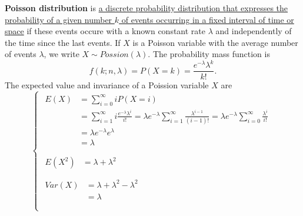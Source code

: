 \documentclass[10pt,onecolumn]{book}
\begin{document}
\textbf{Poisson distribution} is \uline{a discrete probability distribution that expresses the probability of a given number $k$ of events occurring in a fixed interval of time or space} if these events occure with a known constant rate $\lambda$ and independently of the time since the last events. If $X$ is a Poisson variable with the average number of events $\lambda$, we write $X \sim Possion(\lambda)$. The probability mass function is
\begin{equation}
f(k; n, \lambda) = P(X = k) = \frac{e^{-\lambda} \lambda^k}{k!}.
\end{equation}
The expected value and invariance of a Poission variable $X$ are
\begin{equation}\label{eq:poisson_distribution_e_var}
\left\{
	\begin{array}{lr}
	\begin{split}
	E(X)  & = \sum_{i=0}^{\infty} i P(X = i) \\
		  & = \sum_{i=1}^{\infty} i \frac{e^{-\lambda} \lambda^i}{i!} 
		    = \lambda e^{-\lambda} \sum_{i=1}^{\infty} \frac{\lambda^{i - 1}}{(i - 1)!} 
		    = \lambda e^{-\lambda} \sum_{i=0}^{\infty} \frac{\lambda^{i}}{i!} \\
		  & = \lambda e^{-\lambda} e ^ \lambda \\
		  & = \lambda \\
	\end{split} \\
	\begin{split}
	E(X^2) & = \lambda + \lambda ^ 2 \\
	\end{split} \\
	\begin{split}
	Var(X) & = \lambda + \lambda ^ 2 - \lambda^2 \\
		   & = \lambda \\
	\end{split}  \\
	\end{array}
\right.
\end{equation}
\end{document}
